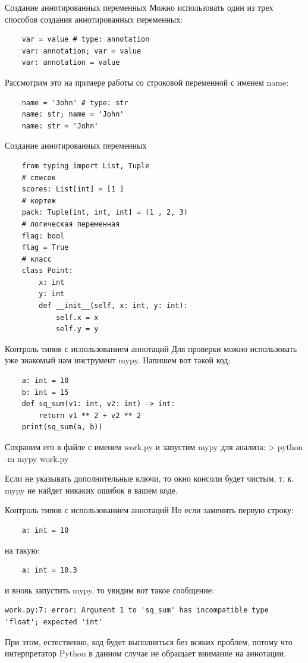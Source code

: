 \documentclass[xcolor=table]{beamer}
\begin{document}
\begin{frame}[fragile]{Создание аннотированных переменных}
	Можно использовать один из трех способов создания аннотированных переменных:
	\begin{verbatim}
	var = value # type: annotation
	var: annotation; var = value
	var: annotation = value
	\end{verbatim}

	Рассмотрим это на примере работы со строковой переменной с именем name:
	\begin{verbatim}
	name = 'John' # type: str
	name: str; name = 'John'
	name: str = 'John'
	\end{verbatim}
\end{frame}

\begin{frame}[fragile]{Создание аннотированных переменных}
	\begin{verbatim}
	from typing import List, Tuple
	# список
	scores: List[int] = [1 ]
	# кортеж
	pack: Tuple[int, int, int] = (1 , 2, 3)
	# логическая переменная
	flag: bool
	flag = True
	# класс
	class Point:
		x: int
		y: int		
		def __init__(self, x: int, y: int):
			self.x = x
			self.y = y
	\end{verbatim}
\end{frame}

\begin{frame}[fragile]{Контроль типов с использованием аннотаций}
	Для проверки можно использовать уже знакомый нам инструмент mypy. Напишем вот такой код:
	\begin{verbatim}
	a: int = 10
	b: int = 15	
	def sq_sum(v1: int, v2: int) -> int:
		return v1 ** 2 + v2 ** 2
	print(sq_sum(a, b))
	\end{verbatim}
	
	Сохраним его в файле с именем work.py и запустим mypy для анализа:
	> python -m mypy work.py
	
	Если не указывать дополнительные ключи, то окно консоли будет чистым, т. к. mypy не найдет никаких ошибок в вашем коде.
\end{frame}

\begin{frame}[fragile]{Контроль типов с использованием аннотаций}
	Но если заменить первую строку:
	\begin{verbatim}
	а: int = 10
	\end{verbatim}
на такую:
	\begin{verbatim}
	а: int = 10.3
	\end{verbatim}
	и вновь запустить mypy, то увидим вот такое сообщение:
	\begin{verbatim}
work.py:7: error: Argument 1 to 'sq_sum' has incompatible type 'float'; expected 'int'
	\end{verbatim}

	При этом, естественно, код будет выполняться без всяких проблем, потому что интерпретатор Python в данном случае не обращает внимание на аннотации.	
\end{frame}
\end{document}
